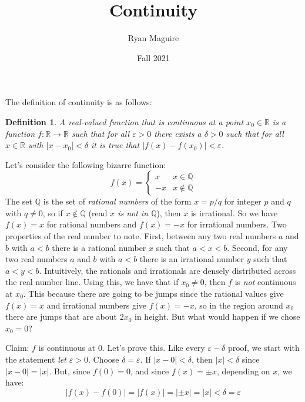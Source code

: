 \documentclass{article}
\title{Continuity}
\author{Ryan Maguire}
\date{Fall 2021}
\theoremstyle{normal}
\newtheorem{definition}{Definition}
\begin{document}
    \maketitle
    The definition of continuity is as follows:
    \begin{definition}
        A real-valued function that is continuous at a point
        $x_{0}\in\mathbb{R}$ is a function $f:\mathbb{R}\rightarrow\mathbb{R}$
        such that for all $\varepsilon>0$ there exists a $\delta>0$ such that
        for all $x\in\mathbb{R}$ with $|x-x_{0}|<\delta$ it is true that
        $|f(x)-f(x_{0})|<\varepsilon$.
    \end{definition}
    Let's consider the following bizarre function:
    \begin{equation}
        f(x)=
        \begin{cases}
            x&x\in\mathbb{Q}\\
            -x&x\notin\mathbb{Q}
        \end{cases}
    \end{equation}
    The set $\mathbb{Q}$ is the set of \textit{rational numbers} of the
    form $x=p/q$ for integer $p$ and $q$ with $q\ne{0}$, so if
    $x\notin\mathbb{Q}$ (read \textit{$x$ is not in $\mathbb{Q}$}), then
    $x$ is irrational. So we have $f(x)=x$ for rational numbers and
    $f(x)=-x$ for irrational numbers. Two properties of the real number to
    note. First, between any two real numbers $a$ and $b$ with $a<b$ there is a
    rational number $x$ such that $a<x<b$. Second, for any two real numbers
    $a$ and $b$ with $a<b$ there is an irrational number $y$ such that $a<y<b$.
    Intuitively, the rationals and irrationals are densely distributed across
    the real number line. Using this, we have that if $x_{0}\ne{0}$, then
    $f$ is \textit{not} continuous at $x_{0}$. This because there are going
    to be jumps since the rational values give $f(x)=x$ and irrational numbers
    give $f(x)=-x$, so in the region around $x_{0}$ there are jumps that are
    about $2x_{0}$ in height. But what would happen if we chose $x_{0}=0$?
    \par\hfill\par
    Claim: $f$ is continuous at $0$. Let's prove this. Like every
    $\varepsilon-\delta$ proof, we start with the statement
    \textit{let $\varepsilon>0$}. Choose $\delta=\varepsilon$. If
    $|x-0|<\delta$, then $|x|<\delta$ since $|x-0|=|x|$. But, since $f(0)=0$,
    and since $f(x)=\pm{x}$, depending on $x$, we have:
    \begin{equation}
        |f(x)-f(0)|=|f(x)|=|\pm{x}|=|x|<\delta=\varepsilon
    \end{equation}
\end{document}
